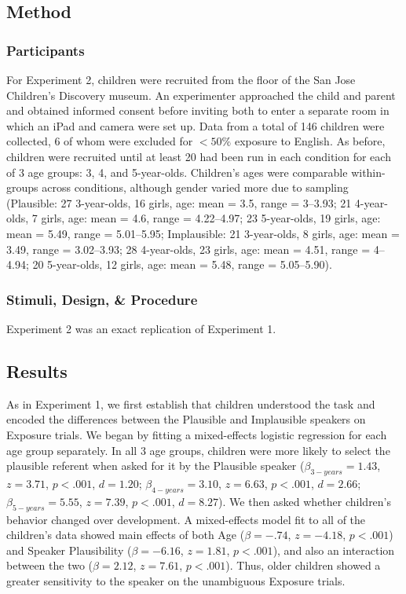 \documentclass[man,floatsintext]{apa6}
\begin{document}
\subsection{Method}

\subsubsection{Participants}

For Experiment 2, children were recruited from the floor of the San Jose Children's Discovery museum. An experimenter approached the child and parent and obtained informed consent before inviting both to enter a separate room in which an iPad and camera were set up. Data from a total of 146 children were collected, 6 of whom were excluded for $<50\%$ exposure to English. As before, children were recruited until at least 20 had been run in each condition for each of 3 age groups: 3, 4, and 5-year-olds. Children's ages were comparable within-groups across conditions, although gender varied more due to sampling (Plausible: 27 3-year-olds, 16 girls, age: mean = 3.5, range = 3--3.93; 21 4-year-olds, 7 girls, age: mean = 4.6, range = 4.22--4.97; 23 5-year-olds, 19 girls, age: mean = 5.49, range = 5.01--5.95; Implausible: 21 3-year-olds, 8 girls, age: mean = 3.49, range = 3.02--3.93; 28 4-year-olds, 23 girls, age: mean = 4.51, range = 4--4.94; 20 5-year-olds, 12 girls, age: mean = 5.48, range = 5.05--5.90).


\subsubsection{Stimuli, Design, \& Procedure}

Experiment 2 was an exact replication of Experiment 1.

\subsection{Results}

As in Experiment 1, we first establish that children understood the task and encoded the differences between the Plausible and Implausible speakers on Exposure trials. We began by fitting a mixed-effects logistic regression for each age group separately. In all 3 age groups, children were more likely to select the plausible referent when asked for it by the Plausible speaker ($\beta_{3-years} = 1.43$, $z = 3.71$, $p < .001$, $d = 1.20$; $\beta_{4-years} = 3.10$, $z = 6.63$, $p < .001$, $d = 2.66$; $\beta_{5-years} = 5.55$, $z = 7.39$, $p < .001$, $d = 8.27$). We then asked whether children's behavior changed over development. A mixed-effects model fit to all of the children's data showed main effects of both Age ($\beta = -.74$, $z = -4.18$, $p < .001$) and Speaker Plausibility ($\beta = -6.16$, $z = 1.81$, $p < .001$), and also an interaction between the two ($\beta = 2.12$, $z = 7.61$, $p < .001$). Thus, older children showed a greater sensitivity to the speaker on the unambiguous Exposure trials.
\end{document}
